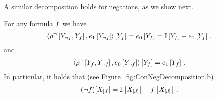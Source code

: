 A similar decomposition holds for negations, as we show next.

\begin{theorem}
    For any formula $f$ we have
    \begin{align*}
        \left\langle 
            \rho^{\lnot}\left[Y_{\lnot f},Y_{f}\right],e_1\left[Y_{\lnot f}\right]
        \right\rangle \left[ Y_{f} \right]
        = e_0\left[Y_{f}\right] =  \mathbb{I}\left[Y_{f}\right] - e_1\left[Y_{f}\right] \, .
    \end{align*}
    and
    \begin{align*}
        \left\langle 
            \rho^{\lnot}\left[Y_{f},Y_{\lnot f}\right],e_0\left[Y_{\lnot f}\right]
        \right\rangle \left[ Y_{f} \right]
        = e_1\left[Y_{f}\right] \, .
    \end{align*}
    In particular, it holds that (see Figure~\ref{fig:ConNegDecomposition}b)
    \begin{align*}
    (\lnot f)[X_{[d]}]
        = \mathbb{I}\left[X_{[d]}\right] - f\left[X_{[d]}\right]  \, .
    \end{align*}
\end{theorem}
